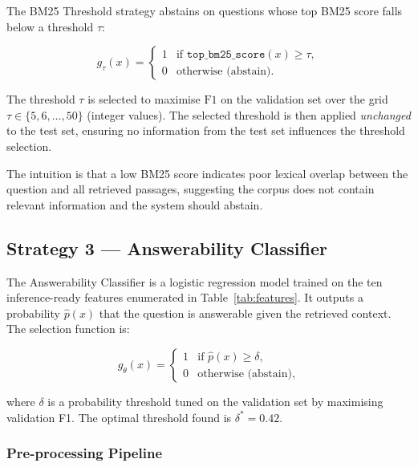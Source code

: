 The BM25 Threshold strategy abstains on questions whose top BM25 score falls
below a threshold $\tau$:

\begin{equation}
  g_\tau(x) =
  \begin{cases}
    1 & \text{if } \texttt{top\_bm25\_score}(x) \geq \tau, \\
    0 & \text{otherwise (abstain).}
  \end{cases}
  \label{eq:bm25_threshold}
\end{equation}

The threshold $\tau$ is selected to maximise $\text{F1}$ on the validation set
over the grid $\tau \in \{5, 6, \ldots, 50\}$ (integer values). The selected
threshold is then applied \emph{unchanged} to the test set, ensuring no
information from the test set influences the threshold selection.

The intuition is that a low BM25 score indicates poor lexical overlap between
the question and all retrieved passages, suggesting the corpus does not contain
relevant information and the system should abstain.

\subsection{Strategy 3 — Answerability Classifier}
\label{sec:meth_classifier}

The Answerability Classifier is a logistic regression model trained on the
ten inference-ready features enumerated in Table~\ref{tab:features}. It outputs a probability
$\hat{p}(x)$ that the question is answerable given the retrieved context. The
selection function is:

\begin{equation}
  g_\theta(x) =
  \begin{cases}
    1 & \text{if } \hat{p}(x) \geq \delta, \\
    0 & \text{otherwise (abstain),}
  \end{cases}
  \label{eq:classifier_threshold}
\end{equation}

where $\delta$ is a probability threshold tuned on the validation set by
maximising validation F1. The optimal threshold found is $\delta^* = 0.42$.

\subsubsection{Pre-processing Pipeline}

